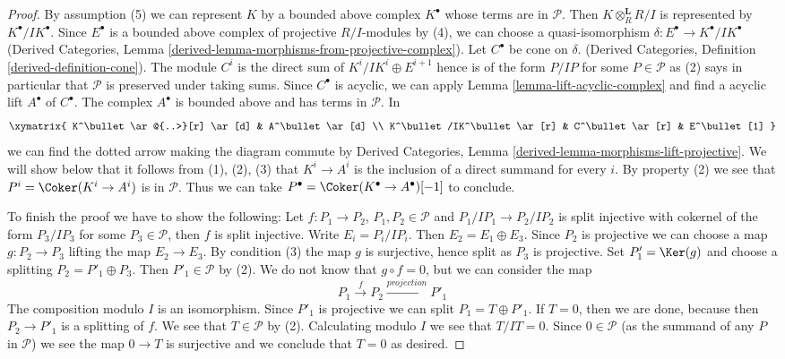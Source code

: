 \begin{proof}
By assumption (5) we can represent $K$ by a bounded above complex 
$K^\bullet$ whose terms are in $\mathcal{P}$. Then $K \otimes_R^\mathbf{L} R/I$
is represented by $K^\bullet/IK^\bullet$. Since $E^\bullet$ is
a bounded above complex of projective $R/I$-modules by (4), 
we can choose a quasi-isomorphism $\delta : E^\bullet \to K^\bullet/IK^\bullet$
(Derived Categories, Lemma
\ref{derived-lemma-morphisms-from-projective-complex}).
Let $C^\bullet$ be cone on $\delta$.
(Derived Categories, Definition \ref{derived-definition-cone}).
The module $C^i$ is the direct sum of $K^i/IK^i \oplus E^{i + 1}$
hence is of the form $P/IP$ for some $P \in \mathcal{P}$
as (2) says in particular that $\mathcal{P}$ is preserved under taking sums.
Since $C^\bullet$ is acyclic, we can apply
Lemma \ref{lemma-lift-acyclic-complex} and find a acyclic
lift $A^\bullet$ of $C^\bullet$. The complex $A^\bullet$ is
bounded above and has terms in $\mathcal{P}$. In
$$
\xymatrix{
K^\bullet \ar@{..>}[r] \ar[d] & A^\bullet \ar[d] \\
K^\bullet/IK^\bullet \ar[r] & C^\bullet \ar[r] & E^\bullet[1]
}
$$
we can find the dotted arrow making the diagram commute
by Derived Categories, Lemma
\ref{derived-lemma-morphisms-lift-projective}.
We will show below that it follows from (1), (2), (3)
that $K^i \to A^i$ is the inclusion of a direct summand
for every $i$. By property (2) we see that $P^i = \Coker(K^i \to A^i)$
is in $\mathcal{P}$. Thus we can take
$P^\bullet = \Coker(K^\bullet \to A^\bullet)[-1]$ to conclude.

\medskip\noindent
To finish the proof we have to show the following: Let $f : P_1 \to P_2$,
$P_1, P_2 \in \mathcal{P}$ and $P_1/IP_1 \to P_2/IP_2$ is split
injective with cokernel of the form $P_3/IP_3$ for some
$P_3 \in \mathcal{P}$, then $f$ is split injective.
Write $E_i = P_i/IP_i$. Then $E_2 = E_1 \oplus E_3$.
Since $P_2$ is projective we can choose a map $g : P_2 \to P_3$
lifting the map $E_2 \to E_3$. By condition (3) the map $g$
is surjective, hence split as $P_3$ is projective. Set $P_1' = \Ker(g)$
and choose a splitting $P_2 = P'_1 \oplus P_3$. Then $P'_1 \in \mathcal{P}$
by (2). We do not know that
$g \circ f = 0$, but we can consider the map
$$
P_1 \xrightarrow{f} P_2 \xrightarrow{projection} P'_1
$$
The composition modulo $I$ is an isomorphism. Since $P'_1$ is
projective we can split $P_1 = T \oplus P'_1$. If $T = 0$, then
we are done, because then $P_2 \to P'_1$ is a splitting of $f$.
We see that $T \in \mathcal{P}$ by (2).
Calculating modulo $I$ we see that $T/IT = 0$.
Since $0 \in \mathcal{P}$ (as the summand of any $P$ in $\mathcal{P}$)
we see the map $0 \to T$ is surjective and we conclude that $T = 0$
as desired.
\end{proof}

